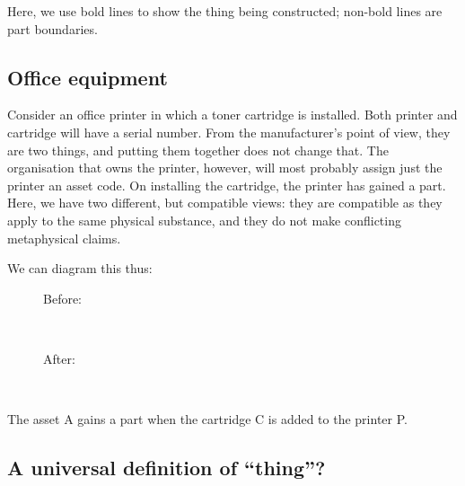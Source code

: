 \documentclass[english,a5paper]{scrartcl}
\newlength{\largeboxwidth}\setlength{\largeboxwidth}{4em}
\newlength{\boldfboxrule}\setlength{\boldfboxrule}{3\fboxrule}
\newlength{\origfboxrule}\setlength{\origfboxrule}{\fboxrule}
\newcommand{\boldframebox}[2][\width+2\fboxsep]{{\setlength{\fboxrule}{\boldfboxrule}\framebox[#1]{#2}}}
\newcommand{\boldfbox}[1]{\boldframebox{#1}}
\begin{document}
\noindent Here, we use bold lines to show the thing being constructed; non-bold lines are part boundaries.

\subsection{Office equipment}

Consider an office printer in which a toner cartridge is installed. Both printer and cartridge will have a serial number. From the manufacturer’s point of view, they are two things, and putting them together does not change that. The organisation that owns the printer, however, will most probably assign just the printer an asset code. On installing the cartridge, the printer has gained a part. Here, we have two different, but compatible views: they are compatible as they apply to the same physical substance, and they do not make conflicting metaphysical claims.

\pagebreak We can diagram this thus:

\begin{figure}[h]
  \newsavebox{\combinedboldthing}%
  \savebox{\combinedboldthing}{\boldfbox{\makebox[\largeboxwidth]{P}\raisebox{0pt}[0pt][0pt]{\rule[-\dp\partthing]{\origfboxrule}{\ht\partthing+\dp\partthing}}\hspace{\fboxsep}\hspace{-1\origfboxrule}C}}%
  \centering%
  Before: \begin{varwidth}[t]{1in}\boldframebox[\largeboxwidth]{P}\\\end{varwidth}\hspace{1em}
  \hspace{5ex}%
  After: \begin{varwidth}[t]{1in}\usebox{\combinedboldthing}\\\end{varwidth}%
  \caption{}%
  \label{printerfigure}
\end{figure}

\noindent The asset A gains a part when the cartridge C is added to the printer P.

\subsection{A universal definition of “thing”?}
\end{document}
